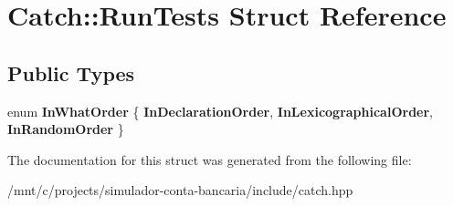 \hypertarget{structCatch_1_1RunTests}{}\section{Catch\+:\+:Run\+Tests Struct Reference}
\label{structCatch_1_1RunTests}
\subsection*{Public Types}
\begin{DoxyCompactItemize}
\item 
\mbox{\label{structCatch_1_1RunTests_ab56bd851b1dd085869992d1a9d73dc5d}} 
enum {\bfseries In\+What\+Order} \{ {\bfseries In\+Declaration\+Order}, 
{\bfseries In\+Lexicographical\+Order}, 
{\bfseries In\+Random\+Order}
 \}
\end{DoxyCompactItemize}


The documentation for this struct was generated from the following file\+:\begin{DoxyCompactItemize}
\item 
/mnt/c/projects/simulador-\/conta-\/bancaria/include/catch.\+hpp\end{DoxyCompactItemize}
